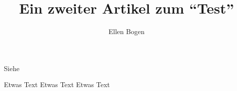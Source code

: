 \documentclass{dtk2}
\author{Ellen Bogen}
\begin{document}
\title{Ein zweiter Artikel zum "`Test"'}

\maketitle

Siehe~\cite{lamport:handbuch}

Etwas Text \clearpage
Etwas Text \clearpage
Etwas Text \clearpage

\nocite{*}
\printbibliography
\end{document}

